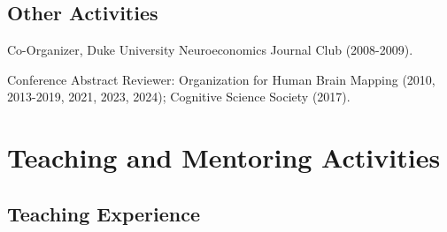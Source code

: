 \documentclass[11pt, letterpaper]{article}
\begin{document}
\subsection*{Other Activities}
\begin{hangparas}{.5in}{1}
Co-Organizer, Duke University Neuroeconomics Journal Club (2008-2009).

Conference Abstract Reviewer: Organization for Human Brain Mapping (2010, 2013-2019, 2021, 2023, 2024); Cognitive Science Society (2017). \\

\end{hangparas}


\section*{Teaching and Mentoring Activities}
\subsection*{Teaching Experience}
\end{document}
